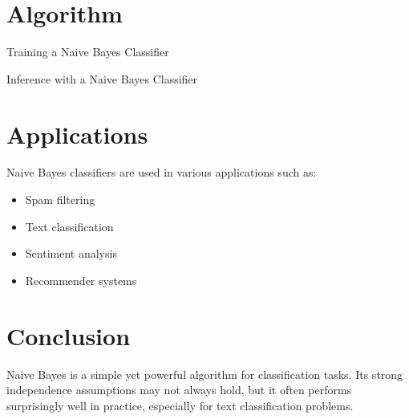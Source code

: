 \documentclass{article}
\begin{document}
\section{Algorithm}

\begin{algorithm}[H]
\SetAlgoLined
{}



\caption{Training a Naive Bayes Classifier}
\end{algorithm}
\begin{algorithm}[H]
\SetAlgoLined
{}



\caption{Inference with a Naive Bayes Classifier}
\end{algorithm}
\section{Applications}
Naive Bayes classifiers are used in various applications such as:
\begin{itemize}
    \item Spam filtering
    \item Text classification
    \item Sentiment analysis
    \item Recommender systems
\end{itemize}

\section{Conclusion}
Naive Bayes is a simple yet powerful algorithm for classification tasks. Its strong independence assumptions may not always hold, but it often performs surprisingly well in practice, especially for text classification problems.
\end{document}
